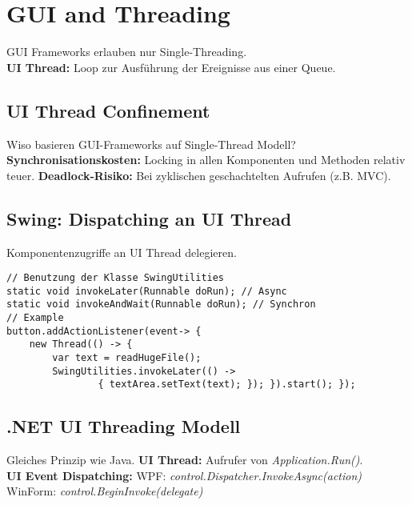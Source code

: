 \section{GUI and Threading}
GUI Frameworks erlauben nur Single-Threading. \\ 
\textbf{UI Thread:} Loop zur Ausführung der Ereignisse aus einer Queue.
\subsection{UI Thread Confinement}
Wiso basieren GUI-Frameworks auf Single-Thread Modell?\\
\textbf{Synchronisationskosten:} Locking in allen Komponenten und Methoden relativ teuer.
\textbf{Deadlock-Risiko:} Bei zyklischen geschachtelten Aufrufen (z.B. MVC).

\subsection{Swing: Dispatching an UI Thread}
Komponentenzugriffe an UI Thread delegieren.
\begin{lstlisting}
// Benutzung der Klasse SwingUtilities
static void invokeLater(Runnable doRun); // Async
static void invokeAndWait(Runnable doRun); // Synchron 
// Example
button.addActionListener(event-> {
    new Thread(() -> {
        var text = readHugeFile();
        SwingUtilities.invokeLater(() -> 
                { textArea.setText(text); }); }).start(); });
\end{lstlisting}

\subsection{.NET UI Threading Modell}
Gleiches Prinzip wie Java.
\textbf{UI Thread:} Aufrufer von \textit{Application.Run()}.\\ 
\textbf{UI Event Dispatching:}
WPF: \textit{control.Dispatcher.InvokeAsync(action)}\\ 
WinForm: \textit{control.BeginInvoke(delegate)}


